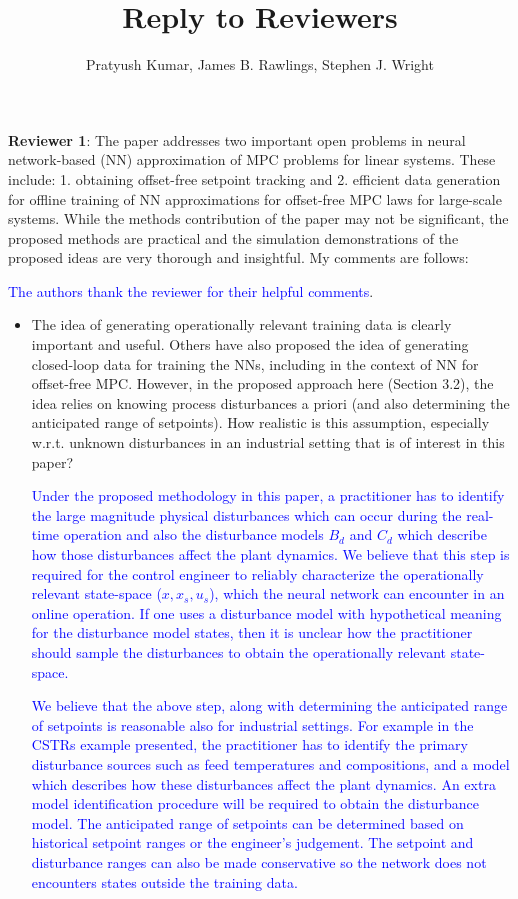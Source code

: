 \documentclass[xcolor=dvipsnames, 11pt]{article}
\title{Reply to Reviewers}
\author{Pratyush Kumar, James B. Rawlings, Stephen J. Wright}
\newcommand{\reply}[1]{\textcolor{blue}{#1}}
\begin{document}
\textbf{Reviewer 1}: The paper addresses two important open problems in neural network-based (NN) approximation of MPC problems for linear systems. These include: 1. obtaining offset-free setpoint tracking and 2. efficient data generation for offline training of NN approximations for offset-free MPC laws for large-scale systems. While the methods contribution of the paper may not be significant, the proposed methods are practical and the simulation demonstrations of the proposed ideas are very thorough and insightful. My comments are follows:

\reply{The authors thank the reviewer for their helpful comments}.

\begin{itemize}
  \item The idea of generating operationally relevant training data is clearly important and useful. Others have also proposed the idea of generating closed-loop data for training the NNs, including in the context of NN for offset-free MPC. However, in the proposed approach here (Section 3.2), the idea relies on knowing process disturbances a priori (and also determining the anticipated range of setpoints). How realistic is this assumption, especially w.r.t. unknown disturbances in an industrial setting that is of interest in this paper?

  \reply{Under the proposed methodology in this paper, a practitioner has to identify the large magnitude physical disturbances which can occur during the real-time operation and also the disturbance models $B_d$ and $C_d$ which describe how those disturbances affect the plant dynamics. We believe that this step is required for the control engineer to reliably characterize the operationally relevant state-space ($x, x_s, u_s$), which the neural network can encounter in an online operation. If one uses a disturbance model with hypothetical meaning for the disturbance model states, then it is unclear how the practitioner should sample the disturbances to obtain the operationally relevant state-space.}

  \reply{We believe that the above step, along with determining the anticipated range of setpoints is reasonable also for industrial settings. For example in the CSTRs example presented, the practitioner has to identify the primary disturbance sources such as feed temperatures and compositions, and a model which describes how these disturbances affect the plant dynamics. An extra model identification procedure will be required to obtain the disturbance model. The anticipated range of setpoints can be determined based on historical setpoint ranges or the engineer's judgement. The setpoint and disturbance ranges can also be made conservative so the network does not encounters states outside the training data.}


\end{itemize}
\end{document}
